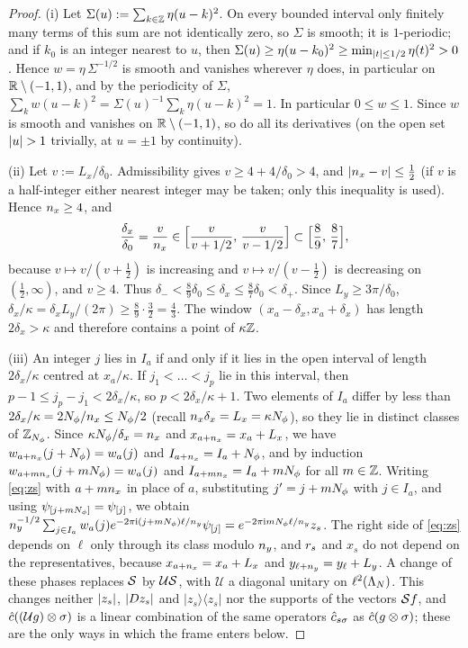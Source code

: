 \begin{proof}
(i) Let $\Sigma(u):=\sum_{k\in\mathbb{Z}}\eta(u-k)^2$. On every bounded interval only finitely many terms of this sum are
not identically zero, so $\Sigma$ is smooth; it is $1$-periodic; and if $k_0$ is an integer nearest to $u$, then
$\Sigma(u)\ge\eta(u-k_0)^2\ge\min_{\lvert t\rvert\le1/2}\eta(t)^2>0$. Hence $w=\eta\,\Sigma^{-1/2}$ is smooth and vanishes
wherever $\eta$ does, in particular on $\mathbb{R}\setminus(-1,1)$, and by the periodicity of $\Sigma$,
$\sum_kw(u-k)^2=\Sigma(u)^{-1}\sum_k\eta(u-k)^2=1$. In particular $0\le w\le1$. Since $w$ is smooth and vanishes on
$\mathbb{R}\setminus(-1,1)$, so do all its derivatives (on the open set $\lvert u\rvert>1$ trivially, at $u=\pm1$ by continuity).

(ii) Let $v:=L_x/\delta_0$. Admissibility gives $v\ge4+4/\delta_0>4$, and $\lvert n_x-v\rvert\le\frac12$ (if $v$ is a
half-integer either nearest integer may be taken; only this inequality is used). Hence $n_x\ge4$, and
\[
\frac{\delta_x}{\delta_0}=\frac v{n_x}\in\Bigl[\frac v{v+1/2},\,\frac v{v-1/2}\Bigr]\subset\Bigl[\frac89,\,\frac87\Bigr],
\]
because $v\mapsto v/(v+\frac12)$ is increasing and $v\mapsto v/(v-\frac12)$ is decreasing on $(\frac12,\infty)$, and
$v\ge4$. Thus $\delta_-<\frac89\delta_0\le\delta_x\le\frac87\delta_0<\delta_+$. Since $L_y\ge3\pi/\delta_0$,
$\delta_x/\kappa=\delta_xL_y/(2\pi)\ge\frac89\cdot\frac32=\frac43$. The window $(x_a-\delta_x,x_a+\delta_x)$ has length
$2\delta_x>\kappa$ and therefore contains a point of $\kappa\mathbb{Z}$.

(iii) An integer $j$ lies in $I_a$ if and only if it lies in the open interval of length $2\delta_x/\kappa$ centred at
$x_a/\kappa$. If $j_1<\dots<j_p$ lie in this interval, then $p-1\le j_p-j_1<2\delta_x/\kappa$, so $p<2\delta_x/\kappa+1$.
Two elements of $I_a$ differ by less than $2\delta_x/\kappa=2N_{\phi}/n_x\le N_{\phi}/2$ (recall $n_x\delta_x=L_x=\kappa N_{\phi}$),
so they lie in distinct classes of $\mathbb{Z}_{N_{\phi}}$. Since $\kappa N_{\phi}/\delta_x=n_x$ and $x_{a+n_x}=x_a+L_x$, we have
$w_{a+n_x}(j+N_{\phi})=w_a(j)$ and $I_{a+n_x}=I_a+N_{\phi}$, and by induction $w_{a+mn_x}(j+mN_{\phi})=w_a(j)$ and
$I_{a+mn_x}=I_a+mN_{\phi}$ for all $m\in\mathbb{Z}$. Writing \eqref{eq:zs} with $a+mn_x$ in place of $a$, substituting
$j'=j+mN_{\phi}$ with $j\in I_a$, and using $\psi_{[j+mN_{\phi}]}=\psi_{[j]}$, we obtain
$n_y^{-1/2}\sum_{j\in I_a}w_a(j)e^{-2\pi\mathrm{i}(j+mN_{\phi})\ell/n_y}\psi_{[j]}=e^{-2\pi\mathrm{i} mN_{\phi}\ell/n_y}z_s$. The right side
of \eqref{eq:zs} depends on $\ell$ only through its class modulo $n_y$, and $r_{s}$ and $x_s$ do not depend on the
representatives, because $x_{a+n_x}=x_a+L_x$ and $y_{\ell+n_y}=y_\ell+L_y$. A change of these phases replaces $\mathcal{S}$
by $\mathcal U\mathcal{S}$, with $\mathcal U$ a diagonal unitary on $\ell^2(\Lambda_N)$. This changes neither $\lvert z_s\rvert$,
$\lvert Dz_s\rvert$ and $\lvert z_s\rangle\langle z_s\rvert$ nor the supports of the vectors $\mathcal{S} f$, and
$\hat{c}((\mathcal Ug)\otimes\sigma)$ is a linear combination of the same operators $\hat{c}_{s\sigma}$ as
$\hat{c}(g\otimes\sigma)$; these are the only ways in which the frame enters below.
\end{proof}

